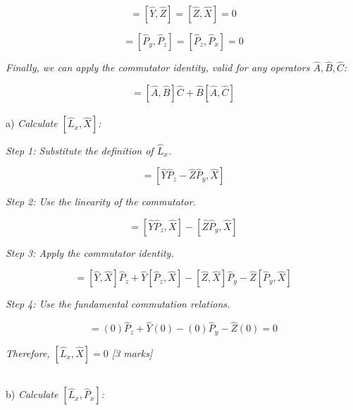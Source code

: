 \documentclass{article}
\begin{document}
\begin{equation}
[\hat{X}, \hat{Y}] = [\hat{Y}, \hat{Z}] = [\hat{Z}, \hat{X}] = 0
\end{equation}

\begin{equation}
[\hat{P}_x, \hat{P}_y] = [\hat{P}_y, \hat{P}_z] = [\hat{P}_z, \hat{P}_x] = 0
\end{equation}

\textit{Finally, we can apply the commutator identity, valid for any operators $\hat{A}, \hat{B}, \hat{C}$:}

\begin{equation}
[\hat{A}, \hat{B}\hat{C}] = [\hat{A}, \hat{B}]\hat{C} + \hat{B}[\hat{A}, \hat{C}]
\end{equation}
\\

a) \textit{Calculate $[\hat{L}_x, \hat{X}]$:}

\textit{Step 1: Substitute the definition of $\hat{L}_x$.}

\begin{equation}
[\hat{L}_x, \hat{X}] = [\hat{Y}\hat{P}_z - \hat{Z}\hat{P}_y, \hat{X}]
\end{equation}

\textit{Step 2: Use the linearity of the commutator.}

\begin{equation}
[\hat{L}_x, \hat{X}] = [\hat{Y}\hat{P}_z, \hat{X}] - [\hat{Z}\hat{P}_y, \hat{X}]
\end{equation}

\textit{Step 3: Apply the commutator identity.}

\begin{equation}
[\hat{L}_x, \hat{X}] = [\hat{Y}, \hat{X}]\hat{P}_z + \hat{Y}[\hat{P}_z, \hat{X}] - [\hat{Z}, \hat{X}]\hat{P}_y - \hat{Z}[\hat{P}_y, \hat{X}]
\end{equation}

\textit{Step 4: Use the fundamental commutation relations.}

\begin{equation}
[\hat{L}_x, \hat{X}] = (0)\hat{P}_z + \hat{Y}(0) - (0)\hat{P}_y - \hat{Z}(0) = 0
\end{equation}

\textit{Therefore, $[\hat{L}_x, \hat{X}] = 0$ [3 marks]}

\\

b) \textit{Calculate $[\hat{L}_x, \hat{P}_x]$:}
\end{document}
